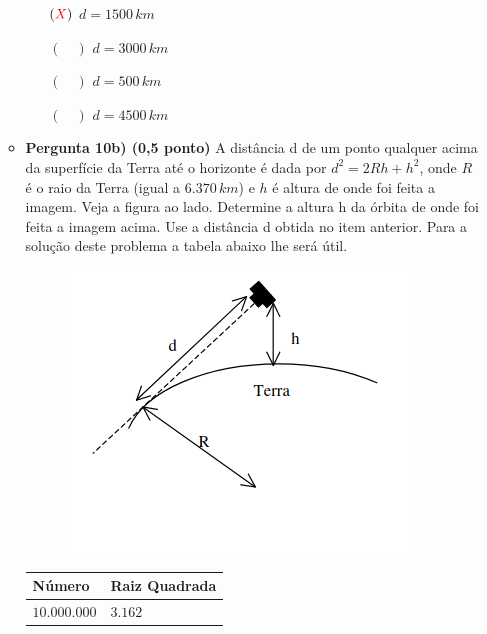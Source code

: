 \documentclass[a4paper, 12pt]{article}
\newcommand{\red}[1]{\textcolor{red}{#1}}
\begin{document}
\begin{flushleft}
\begin{itemize}
\begin{itemize}
\begin{figure}[H]
                        \end{figure}
                        \begin{itemize}
                            \item[$(\red{X})$] $d = 1500 \, km$
                            \item[$(\quad)$] $d = 3000 \, km$
                            \item[$(\quad)$] $d = 500 \, km$
                            \item[$(\quad)$] $d = 4500 \, km$
                        \end{itemize}
                    \item \textbf{Pergunta 10b) (0,5 ponto)} A distância d de um ponto qualquer acima da superfície da Terra até o horizonte é dada por $d^2 = 2Rh + h^2$, onde $R$ é o raio da Terra (igual a $6.370 \, km$) e $h$ é altura de onde foi feita a imagem. Veja a figura ao lado. Determine a altura h da órbita de onde foi feita a imagem acima. Use a distância d obtida no item anterior. Para a solução deste problema a tabela abaixo lhe será útil.
                        \begin{figure}[H]
                            \centering
                            \includegraphics[scale=0.5]{img/10b.png}
                        \end{figure}
                        \begin{center} \begin{tabular}
                        {
                            |M{0.3\textwidth}|M{0.3\textwidth}|
                        }
                            \hline
                            Número & Raiz Quadrada \\ \hline
                            $10.000.000$ & $3.162$ \\ \hline

\end{tabular}
\end{center}
\end{itemize}
\end{itemize}
\end{flushleft}
\end{document}
